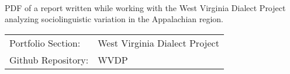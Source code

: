\documentclass[letterpaper]{deedy-resume} %
\begin{document}
\begin{flushleft}
\\
PDF of a report written while working with the West Virginia Dialect
Project analyzing sociolinguistic variation in the Appalachian region.
\vspace{10pt}

\begin{tabular}{l  l}
  Portfolio Section: & West Virginia Dialect Project\\
  Github Repository: & WVDP\\
\end{tabular}
\vspace{10pt}


\end{flushleft}
\end{document}
